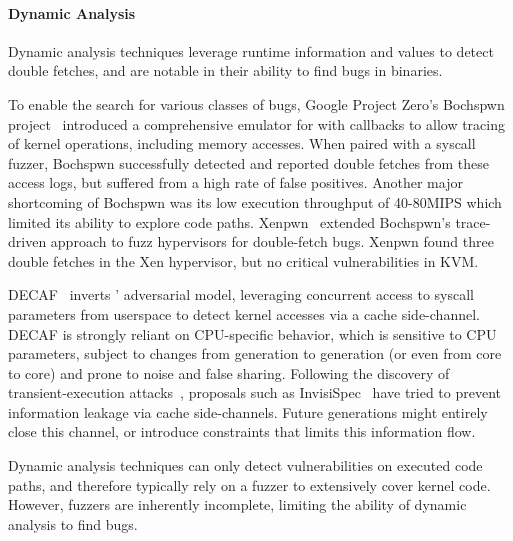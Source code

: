 \paragraph{Dynamic Analysis}
%
Dynamic analysis techniques leverage runtime information and values
to detect double fetches, and are notable in their ability to
find bugs in binaries.

To enable the search for various classes of bugs, Google Project Zero's
Bochspwn project~\cite{jurczyk2013bochspwn} introduced
a comprehensive emulator for  with callbacks to allow
tracing of kernel operations, including memory accesses.
When paired with a syscall fuzzer,
Bochspwn successfully detected and reported double fetches from
these access logs, but suffered from a high rate of false positives.
Another major shortcoming of Bochspwn was its low execution throughput
of 40-80MIPS which limited its ability to explore code paths.
Xenpwn~\cite{wilhelm2016xenpwn} extended Bochspwn's trace-driven 
approach to fuzz hypervisors for double-fetch bugs.
Xenpwn found three double fetches in the Xen hypervisor, but no critical 
vulnerabilities in KVM.

DECAF~\cite{schwartzDECAF} inverts \midas' adversarial model, leveraging
concurrent access to syscall parameters from userspace to detect kernel
accesses via a cache side-channel.
DECAF is strongly reliant on CPU-specific behavior, which
is sensitive to CPU parameters, subject to changes from generation to
generation (or even from core to core) and prone to noise and false sharing.
Following the discovery of transient-execution attacks~\cite{KocherHFGGHHLM019},
proposals such as InvisiSpec~\cite{YanCS0FT19,KhasawnehKSEPA19} have
tried to prevent
information leakage via cache side-channels.
Future generations might entirely close this channel, or introduce constraints
that limits this information flow.

Dynamic analysis techniques can only detect vulnerabilities on executed code
paths, and therefore typically rely on a fuzzer to extensively cover kernel code.
However, fuzzers are inherently incomplete, limiting the ability of dynamic
analysis to find bugs.


